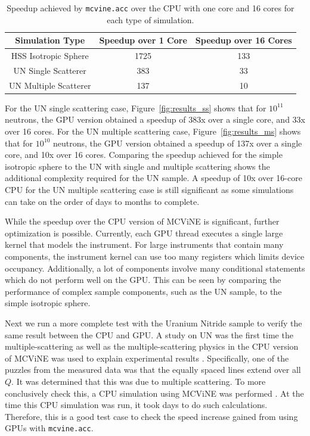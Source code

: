 \begin{table}[h]
    \centering
    \begin{tabular}{c|c|c}
        Simulation Type & Speedup over 1 Core & Speedup over 16 Cores \\
        \hline
        HSS Isotropic Sphere & 1725 & 133 \\
        UN Single Scatterer & 383 & 33 \\
        UN Multiple Scatterer & 137 & 10 \\
        \hline
    \end{tabular}
    \caption{Speedup achieved by \texttt{mcvine.acc} over the CPU with one core and 16 cores for each type of simulation.}
    \label{tab:speedup}
\end{table}


For the UN single scattering case, Figure~\ref{fig:results_ss} shows that for $10^{11}$ neutrons, the GPU version obtained a speedup of 383x over a single core, and 33x over 16 cores. For the UN multiple scattering case, Figure~\ref{fig:results_ms} shows that for $10^{10}$ neutrons, the GPU version obtained a speedup of 137x over a single core, and 10x over 16 cores. Comparing the speedup achieved for the simple isotropic sphere to the UN with single and multiple scattering shows the additional complexity required for the UN sample. A speedup of 10x over 16-core CPU for the UN multiple scattering case is still significant as some simulations can take on the order of days to months to complete.

While the speedup over the CPU version of MCViNE is significant, further optimization is possible. Currently, each GPU thread executes a single large kernel that models the instrument. For large instruments that contain many components, the instrument kernel can use too many registers which limits device occupancy. Additionally, a lot of components involve many conditional statements which do not perform well on the GPU. This can be seen by comparing the performance of complex sample components, such as the UN sample, to the simple isotropic sphere.

Next we run a more complete test with the Uranium Nitride sample to verify the same result between the CPU and GPU.
A study on UN was the first time the multiple-scattering as well as the multiple-scattering physics in the CPU version of MCViNE was used to explain experimental results \cite{lin2014UN}. Specifically, one of the puzzles from the measured data was that the equally spaced lines extend over all $Q$.  It was determined that this was due to multiple scattering. 
To more conclusively check this, a CPU simulation using MCViNE was performed \cite{lin2014UN}.  At the time this CPU simulation was run, it took days to do such calculations.  Therefore, this is a good test case to check the speed increase gained from using GPUs with \texttt{mcvine.acc}.

